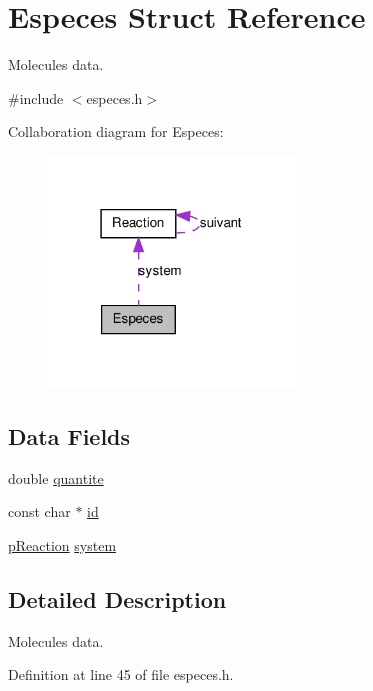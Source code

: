 \hypertarget{structEspeces}{
\section{Especes Struct Reference}
\label{structEspeces}
}


Molecules data.  




{\ttfamily \#include $<$especes.h$>$}



Collaboration diagram for Especes:\nopagebreak
\begin{figure}[H]
\begin{center}
\leavevmode
\includegraphics[width=186pt]{structEspeces__coll__graph}
\end{center}
\end{figure}
\subsection*{Data Fields}
\begin{DoxyCompactItemize}
\item 
double \hyperlink{structEspeces_ab4d42c5e3bcb897311b17030db5b882e}{quantite}
\item 
const char $\ast$ \hyperlink{structEspeces_a2fbe0a8da0e7c223e27f9bf40e48f170}{id}
\item 
\hyperlink{structReaction}{pReaction} \hyperlink{structEspeces_a61d949a99599938950d1508d7cb86d4d}{system}
\end{DoxyCompactItemize}


\subsection{Detailed Description}
Molecules data. 

Definition at line 45 of file especes.h.



